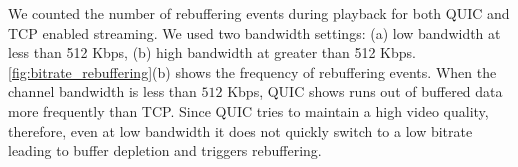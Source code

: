 
We counted the number of rebuffering events during playback for both QUIC and TCP enabled streaming.
We used two bandwidth settings: (a) low bandwidth at less than 512 Kbps, (b) high bandwidth at greater than 512 Kbps.
\fig\ref{fig:bitrate_rebuffering}(b) shows the frequency of rebuffering events.
When the channel bandwidth is less than $512$ Kbps, QUIC shows runs out of buffered data more frequently than TCP. 
Since QUIC tries to maintain a high video quality, therefore, even at low bandwidth it does not quickly switch to a low bitrate leading to buffer depletion and triggers rebuffering.


